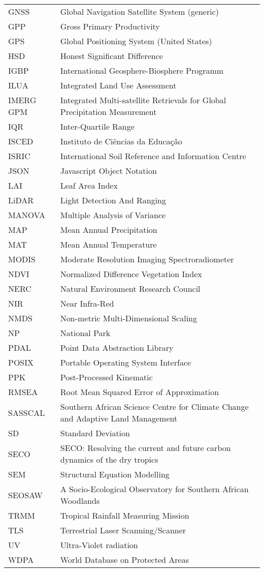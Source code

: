 \begin{longtable}{lp{11cm}}
	GNSS & Global Navigation Satellite System (generic) \\
	GPP & Gross Primary Productivity \\
	GPS & Global Positioning System (United States) \\
	HSD & Honest Significant Difference \\
	IGBP & International Geosphere-Biosphere Programm \\
	ILUA & Integrated Land Use Assessment \\
	IMERG GPM & Integrated Multi-satellite Retrievals for Global Precipitation Measurement \\
	IQR & Inter-Quartile Range \\
	ISCED & Instituto de Ci\^{e}ncias da Educa\c{c}\~{a}o  \\
	ISRIC & International Soil Reference and Information Centre \\
	JSON & Javascript Object Notation \\
	LAI & Leaf Area Index \\
	LiDAR & Light Detection And Ranging \\
	MANOVA & Multiple Analysis of Variance \\
	MAP & Mean Annual Precipitation \\
	MAT & Mean Annual Temperature \\
	MODIS & Moderate Resolution Imaging Spectroradiometer \\
	NDVI & Normalized Difference Vegetation Index \\
	NERC & Natural Environment Research Council \\
	NIR & Near Infra-Red \\
	NMDS & Non-metric Multi-Dimensional Scaling \\
	NP & National Park \\
	PDAL & Point Data Abstraction Library \\
	POSIX & Portable Operating System Interface \\
	PPK & Post-Processed Kinematic \\
	RMSEA & Root Mean Squared Error of Approximation \\
	SASSCAL & Southern African Science Centre for Climate Change and Adaptive Land Management \\
	SD & Standard Deviation \\
	SECO & SECO: Resolving the current and future carbon dynamics of the dry tropics \\ 
	SEM & Structural Equation Modelling \\
	SEOSAW & A Socio-Ecological Observatory for Southern African Woodlands \\
	TRMM & Tropical Rainfall Measuring Mission \\
	TLS & Terrestrial Laser Scanning/Scanner \\
	UV & Ultra-Violet radiation \\
	WDPA & World Database on Protected Areas \\
\end{longtable}
